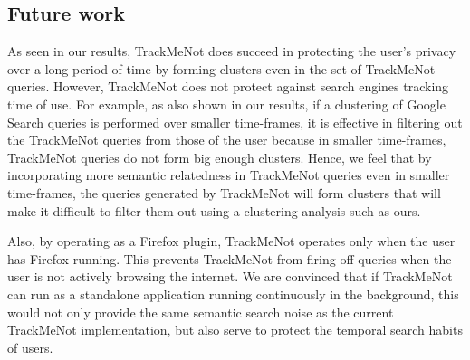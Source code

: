\documentclass[11pt]{article}
\begin{document}
\begin{multicols}{2}
\section{Future work}
\label{sec:future}
As seen in our results, TrackMeNot does succeed in protecting the user's privacy over a long period of time by forming clusters even in the set of TrackMeNot queries. However, TrackMeNot does not protect against search engines tracking time of use. For example, as also shown in our results, if a clustering of Google Search queries is performed over smaller time-frames, it is effective in filtering out the TrackMeNot queries from those of the user because in smaller time-frames, TrackMeNot queries do not form big enough clusters. Hence, we feel that by incorporating more semantic relatedness in TrackMeNot queries even in smaller time-frames, the queries generated by TrackMeNot will form clusters that will make it difficult to filter them out using a clustering analysis such as ours.

Also, by operating as a Firefox plugin, TrackMeNot operates only when the user has Firefox running. This prevents TrackMeNot from firing off queries when the user is not actively browsing the internet. We are convinced that if TrackMeNot can run as a standalone application running continuously in the background, this would not only provide the same semantic search noise as the current TrackMeNot implementation, but also serve to protect the temporal search habits of users.



\end{multicols}
\newpage
\end{document}
